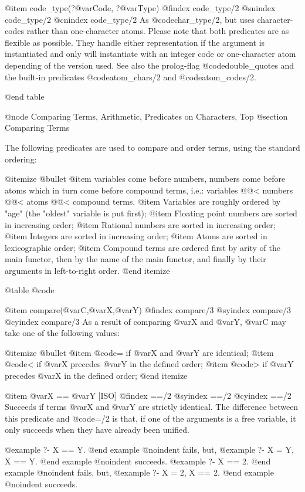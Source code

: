 {{{{@item code_type(?@var{Code}, ?@var{Type})
@findex code_type/2
@snindex code_type/2
@cnindex code_type/2
    As @code{char_type/2}, but uses character-codes rather than
    one-character atoms. Please note that both predicates are as
    flexible as possible. They handle either representation if the
    argument is instantiated and only will instantiate with an integer
    code or one-character atom depending of the version used. See also
    the prolog-flag @code{double_quotes} and the built-in predicates 
    @code{atom_chars/2} and @code{atom_codes/2}.

@end table

@node Comparing Terms, Arithmetic, Predicates on Characters, Top
@section Comparing Terms

The following predicates are used to compare and order terms, using the
standard ordering:

@itemize @bullet
@item
variables come before numbers, numbers come before atoms which in turn
come before compound terms, i.e.: variables @@< numbers @@< atoms @@<
compound terms.
@item
Variables are roughly ordered by "age" (the "oldest" variable is put
first);
@item
Floating point numbers are sorted in increasing order;
@item
Rational numbers are sorted in increasing order;
@item
Integers are sorted in increasing order;
@item
Atoms are sorted in lexicographic order;
@item
Compound terms are ordered first by arity of the main functor, then by
the name of the main functor, and finally by their arguments in
left-to-right order.
@end itemize

@table @code

@item compare(@var{C},@var{X},@var{Y})
@findex compare/3
@syindex compare/3
@cyindex compare/3
As a result of comparing @var{X} and @var{Y}, @var{C} may take one of
the following values:

@itemize @bullet
@item
@code{=} if @var{X} and @var{Y} are identical;
@item
@code{<} if @var{X} precedes @var{Y} in the defined order;
@item
@code{>} if @var{Y} precedes @var{X} in the defined order;
@end itemize

@item @var{X} == @var{Y} [ISO]
@findex ==/2
@syindex ==/2
@cyindex ==/2
Succeeds if terms @var{X} and @var{Y} are strictly identical. The
difference between this predicate and @code{=/2} is that, if one of the
arguments is a free variable, it only succeeds when they have already
been unified.

@example
?- X == Y.
@end example
@noindent
fails, but,
@example
?- X = Y, X == Y.
@end example
@noindent
succeeds.
@example
?- X == 2.
@end example
@noindent
fails, but,
@example
?- X = 2, X == 2.
@end example
@noindent
succeeds.


}}}}
